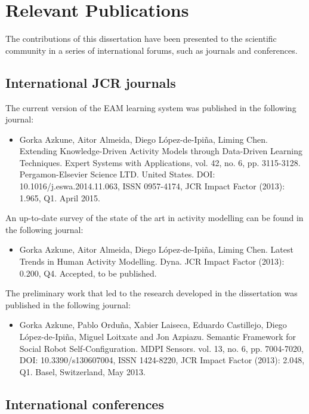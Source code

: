 \section{Relevant Publications}
\label{sec:conclusions:pub}

The contributions of this dissertation have been presented to the scientific community in a series of international forums, such as journals and conferences.

\subsection{International JCR journals}

The current version of the EAM learning system was published in the following journal:

\begin{itemize}
 \item Gorka Azkune, Aitor Almeida, Diego López-de-Ipiña, Liming Chen. Extending Knowledge-Driven Activity Models through Data-Driven Learning Techniques. Expert Systems with Applications, vol. 42, no. 6, pp. 3115-3128. Pergamon-Elsevier Science LTD. United States. DOI: 10.1016/j.eswa.2014.11.063, ISSN 0957-4174, JCR Impact Factor (2013): 1.965, Q1. April 2015. 
\end{itemize}

An up-to-date survey of the state of the art in activity modelling can be found in the following journal:

\begin{itemize}
 \item Gorka Azkune, Aitor Almeida, Diego López-de-Ipiña, Liming Chen. Latest Trends in Human Activity Modelling. Dyna. JCR Impact Factor (2013): 0.200, Q4. Accepted, to be published. 
\end{itemize}

The preliminary work that led to the research developed in the dissertation was published in the following journal:

\begin{itemize}
 \item Gorka Azkune, Pablo Orduña, Xabier Laiseca, Eduardo Castillejo, Diego López-de-Ipiña, Miguel Loitxate and Jon Azpiazu. Semantic Framework for Social Robot Self-Configuration. MDPI Sensors. vol. 13, no. 6, pp. 7004-7020, DOI: 10.3390/s130607004, ISSN 1424-8220, JCR Impact Factor (2013): 2.048, Q1. Basel, Switzerland, May 2013.
\end{itemize}

\subsection{International conferences}


